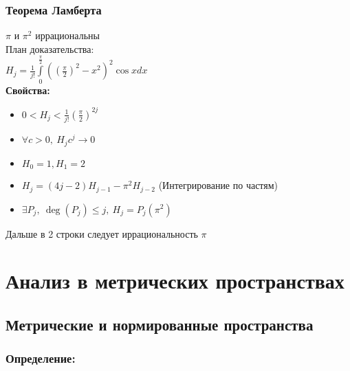 \documentclass[12pt]{report} %
\begin{document}
\subsection*{\textbf{Теорема Ламберта}}
\begin{spacing}{1.3}
$\pi$ и $\pi^2$ иррациональны\\
План доказательства:\\
$H_{j} = \frac{1}{j!}\displaystyle\int\limits_{0}^{\frac{\pi}{2}}{\left(\left(\frac{\pi}{2}\right)^2 - x^2\right)^2\cos x dx}$\\
\textbf{Свойства:}
\begin{itemize}
  \item $0 < H_j < \frac{1}{j!}\left( {\frac{\pi}{2}}\right)^{2j}$
  \item $\forall c > 0, \ H_jc^j \rightarrow 0$
  \item $H_{0} = 1, H_{1} = 2$
  \item $H_{j} = (4j - 2)H_{j - 1} - \pi^2H_{j - 2}$ (Интегрирование по частям)
  \item $\exists P_j, \ \deg(P_j) \leqslant j, \ H_j = P_j\left(\pi^2  \right)$
\end{itemize}
\end{spacing}
Дальше в 2 строки следует иррациональность $\pi$




\chapter*{Анализ в метрических пространствах}

\section*{Метрические и нормированные пространства}
\subsection*{Определение:}
\end{document}
